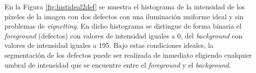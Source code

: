 	\begin{figure}[H]
		\begin{floatrow}
		\end{floatrow}
	\end{figure}
En la Figura \ref{fig:histideal2def} se muestra el histograma de la intensidad de los píxeles de la imagen con dos defectos con una iluminación uniforme ideal y sin problemas de \textit{vignetting}. En dicho histograma se distingue de forma binaria el \textit{foreground} (defectos) con valores de intensidad iguales a 0, del \textit{background} con valores de intensidad iguales a 195. Bajo estas condiciones ideales, la segmentación de los defectos puede ser realizada de inmediato eligiendo cualquier umbral de intensidad que se encuentre entre el \textit{foreground} y el \textit{background}. 

